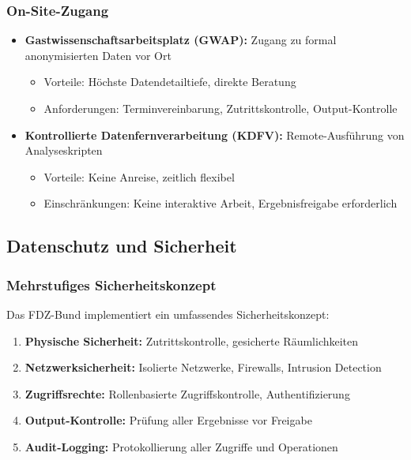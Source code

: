 \documentclass[
  ngerman,
  10pt,
  twocolumn]{article}
\providecommand{\tightlist}{%
  \setlength{\itemsep}{0pt}\setlength{\parskip}{0pt}}
\begin{document}
\subsubsection{On-Site-Zugang}\label{on-site-zugang}

\begin{itemize}
\tightlist
\item
  \textbf{Gastwissenschaftsarbeitsplatz (GWAP):} Zugang zu formal
  anonymisierten Daten vor Ort

  \begin{itemize}
  \tightlist
  \item
    Vorteile: Höchste Datendetailtiefe, direkte Beratung
  \item
    Anforderungen: Terminvereinbarung, Zutrittskontrolle,
    Output-Kontrolle
  \end{itemize}
\item
  \textbf{Kontrollierte Datenfernverarbeitung (KDFV):} Remote-Ausführung
  von Analyseskripten

  \begin{itemize}
  \tightlist
  \item
    Vorteile: Keine Anreise, zeitlich flexibel
  \item
    Einschränkungen: Keine interaktive Arbeit, Ergebnisfreigabe
    erforderlich
  \end{itemize}
\end{itemize}

\subsection{Datenschutz und
Sicherheit}\label{datenschutz-und-sicherheit}

\subsubsection{Mehrstufiges
Sicherheitskonzept}\label{mehrstufiges-sicherheitskonzept}

Das FDZ-Bund implementiert ein umfassendes Sicherheitskonzept:

\begin{enumerate}
\def\labelenumi{\arabic{enumi}.}
\tightlist
\item
  \textbf{Physische Sicherheit:} Zutrittskontrolle, gesicherte
  Räumlichkeiten
\item
  \textbf{Netzwerksicherheit:} Isolierte Netzwerke, Firewalls, Intrusion
  Detection
\item
  \textbf{Zugriffsrechte:} Rollenbasierte Zugriffskontrolle,
  Authentifizierung
\item
  \textbf{Output-Kontrolle:} Prüfung aller Ergebnisse vor Freigabe
\item
  \textbf{Audit-Logging:} Protokollierung aller Zugriffe und Operationen
\end{enumerate}
\end{document}
